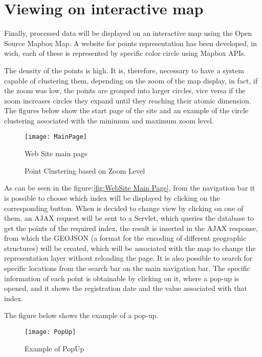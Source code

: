 \documentclass[tesi]{subfiles}
\begin{document}
\section{Viewing on interactive map}\label{sc:Viewing on interactive map}
Finally, processed data will be displayed on an interactive map using the Open Source Mapbox Map. A website for points representation has been developed, in wich, each of these is represented by specific color circle using Mapbox APIs.

The density of the points is high. It is, therefore, necessary to have a system capable of clustering them, depending on the zoom of the map display, in fact, if the zoom was low, the points are grouped into larger circles, vice versa if the zoom increases circles they expand until they reaching their atomic dimension.
The figures below show the start page of the site and an example of the circle clustering associated with the minimum and maximum zoom level.

\begin{figure}[H]
\centering
\texttt{[image: MainPage]}
\caption{Web Site main page}
\end{figure}\label{fig:WebSite Main Page}

\begin{figure}[H]
  \centering

  \hspace{10mm}
  \caption{Point Clustering based on Zoom Level}
  \label{fig:Point Clustering based on Zoom Level}
\end{figure}
\clearpage


As can be seen in the figure:\ref{fig:WebSite Main Page}, from the navigation bar it is possible to choose which index will be displayed by clicking on the corresponding button. When is decided to change view by clicking on one of them, an AJAX request will be sent to a Servlet, which queries the database to get the points of the required index, the result is inserted in the AJAX response, from which the GEOJSON (a format for the encoding of different geographic structures) will be created, which will be associated with the map to change the representation layer without reloading the page.
It is also possible to search for specific locations from the search bar on the main navigation bar.
The specific information of each point is obtainable by clicking on it, where a pop-up is opened, and it shows the registration date and the value associated with that index.

The figure below shows the example of a pop-up.


\begin{figure}[H]
\centering
\texttt{[image: PopUp]}
\caption{Example of PopUp}
\end{figure}\label{fig:PopUp}
\end{document}
